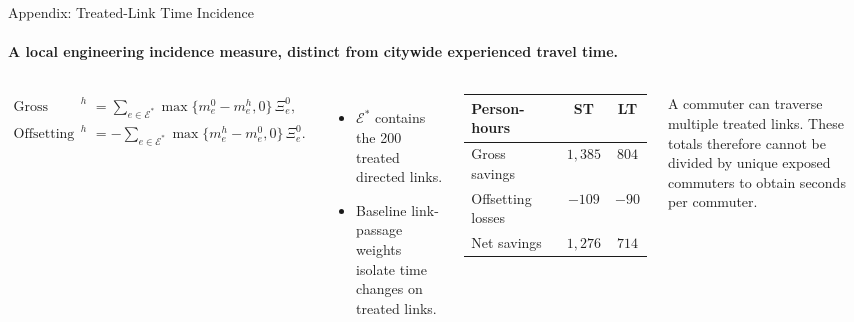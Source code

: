 \documentclass[11pt,aspectratio=169]{beamer}
\newcommand{\navback}[1]{\par\vspace{0.35em}\noindent\hfill\hyperlink{#1}{\beamerreturnbutton{back}}}
\begin{document}
\begin{frame}[label=apptreatedtime]{Appendix: Treated-Link Time Incidence}
\framesubtitle{A local engineering incidence measure, distinct from citywide experienced travel time.}
\begin{columns}[T,onlytextwidth]
\scriptsize
\begin{align*}
\text{Gross savings}^{h}
  &=\sum_{e\in\mathcal E^*}\max\{m_e^0-m_e^h,0\}\,\Xi_e^0,\\
\text{Offsetting losses}^{h}
  &=-\sum_{e\in\mathcal E^*}\max\{m_e^h-m_e^0,0\}\,\Xi_e^0.
\end{align*}
\begin{itemize}\scriptsize
  \item $\mathcal E^*$ contains the 200 treated directed links.
  \item Baseline link-passage weights isolate time changes on treated links.
\end{itemize}
\centering\scriptsize
\begin{tabular}{lcc}
\toprule
Person-hours & ST & LT \\
\midrule
Gross savings & $1{,}385$ & $804$ \\
Offsetting losses & $-109$ & $-90$ \\
Net savings & $1{,}276$ & $714$ \\
\bottomrule
\end{tabular}
\vspace{0.55em}

\raggedright\scriptsize A commuter can traverse multiple treated links. These totals therefore cannot be divided by unique exposed commuters to obtain seconds per commuter.
\end{columns}
\navback{result2}
\end{frame}
\end{document}

